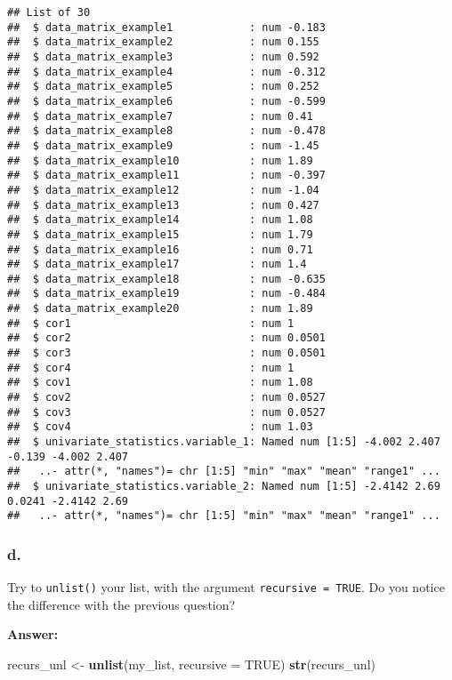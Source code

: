 \documentclass[]{article}
\newenvironment{Shaded}{\begin{snugshade}}{\end{snugshade}}
\newcommand{\DataTypeTok}[1]{\textcolor[rgb]{0.13,0.29,0.53}{#1}}
\newcommand{\KeywordTok}[1]{\textcolor[rgb]{0.13,0.29,0.53}{\textbf{#1}}}
\newcommand{\NormalTok}[1]{#1}
\newcommand{\OtherTok}[1]{\textcolor[rgb]{0.56,0.35,0.01}{#1}}
\newcommand{\StringTok}[1]{\textcolor[rgb]{0.31,0.60,0.02}{#1}}
\begin{document}
\begin{verbatim}
## List of 30
##  $ data_matrix_example1            : num -0.183
##  $ data_matrix_example2            : num 0.155
##  $ data_matrix_example3            : num 0.592
##  $ data_matrix_example4            : num -0.312
##  $ data_matrix_example5            : num 0.252
##  $ data_matrix_example6            : num -0.599
##  $ data_matrix_example7            : num 0.41
##  $ data_matrix_example8            : num -0.478
##  $ data_matrix_example9            : num -1.45
##  $ data_matrix_example10           : num 1.89
##  $ data_matrix_example11           : num -0.397
##  $ data_matrix_example12           : num -1.04
##  $ data_matrix_example13           : num 0.427
##  $ data_matrix_example14           : num 1.08
##  $ data_matrix_example15           : num 1.79
##  $ data_matrix_example16           : num 0.71
##  $ data_matrix_example17           : num 1.4
##  $ data_matrix_example18           : num -0.635
##  $ data_matrix_example19           : num -0.484
##  $ data_matrix_example20           : num 1.89
##  $ cor1                            : num 1
##  $ cor2                            : num 0.0501
##  $ cor3                            : num 0.0501
##  $ cor4                            : num 1
##  $ cov1                            : num 1.08
##  $ cov2                            : num 0.0527
##  $ cov3                            : num 0.0527
##  $ cov4                            : num 1.03
##  $ univariate_statistics.variable_1: Named num [1:5] -4.002 2.407 -0.139 -4.002 2.407
##   ..- attr(*, "names")= chr [1:5] "min" "max" "mean" "range1" ...
##  $ univariate_statistics.variable_2: Named num [1:5] -2.4142 2.69 0.0241 -2.4142 2.69
##   ..- attr(*, "names")= chr [1:5] "min" "max" "mean" "range1" ...
\end{verbatim}

\hypertarget{d.-1}{%
\subsubsection{d.}\label{d.-1}}

Try to \texttt{unlist()} your list, with the argument
\texttt{recursive\ =\ TRUE}. Do you notice the difference with the
previous question?

\textbf{Answer:}

\begin{Shaded}
\begin{Highlighting}[]
\NormalTok{recurs_unl <-}\StringTok{ }\KeywordTok{unlist}\NormalTok{(my_list, }\DataTypeTok{recursive =} \OtherTok{TRUE}\NormalTok{)}
\KeywordTok{str}\NormalTok{(recurs_unl)}
\end{Highlighting}
\end{Shaded}
\end{document}
